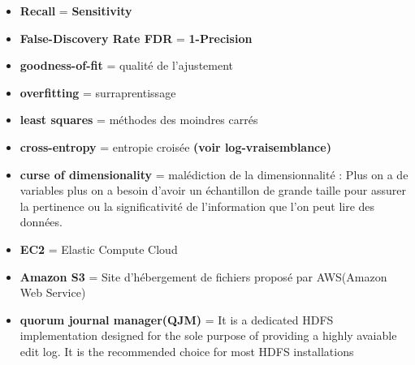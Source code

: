 \documentclass[french]{article}
\begin{document}
\begin{itemize}[label=\textbullet]
	\item \textbf{Recall} = \textbf{Sensitivity}
	\item \textbf{False-Discovery Rate FDR} = \textbf{1-Precision}
	\item \textbf{goodness-of-fit} = qualité de l'ajustement
	\item \textbf{overfitting} = surraprentissage
	\item  \textbf{least squares} = méthodes des moindres carrés
	\item \textbf{cross-entropy} = entropie croisée \textbf{(voir log-vraisemblance)}
	\item \textbf{curse of dimensionality} = malédiction de la dimensionnalité : Plus on a de variables plus on a besoin d'avoir un échantillon de grande taille pour assurer la pertinence ou la significativité de l’information que l’on peut lire des données.
	\item \textbf{EC2} = Elastic Compute Cloud
	\item \textbf{Amazon S3} = Site d'hébergement de fichiers proposé par AWS(Amazon Web Service)
	\item \textbf{quorum journal manager(QJM)} = It is a dedicated HDFS implementation designed for the sole purpose of providing a highly avaiable edit log. It is the recommended choice for most HDFS installations
	\end{itemize}
\end{document}
